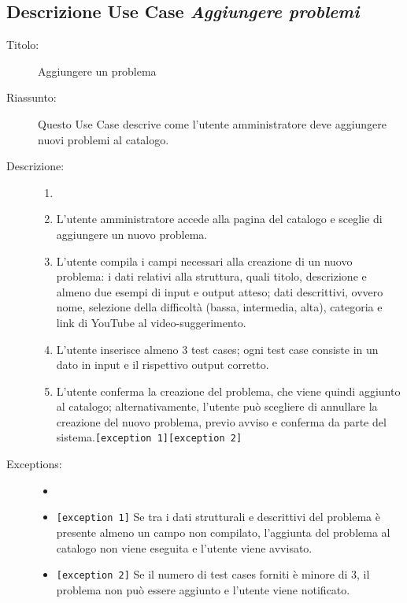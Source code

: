 \documentclass[11pt, a4paper]{article}
\theoremstyle{definition} %
\begin{document}
\newpage
\subsection*{Descrizione Use Case \textit{Aggiungere problemi}}
\begin{description}
    \item[Titolo:] Aggiungere un problema
    
    \item[Riassunto:] Questo Use Case descrive come l'utente amministratore
    deve aggiungere nuovi problemi al catalogo.

    \item[Descrizione:]
    \begin{enumerate}
        \item[]
        \item L'utente amministratore accede alla pagina del catalogo e sceglie di aggiungere un nuovo problema.
        \item L'utente compila i campi necessari alla creazione di un nuovo problema: i dati relativi alla struttura, quali titolo, descrizione e almeno due esempi di input e output atteso; dati descrittivi, ovvero nome, selezione della difficoltà (bassa, intermedia, alta), categoria e link di YouTube al video-suggerimento.
        \item L'utente inserisce almeno 3 test cases; ogni test case consiste in un dato in input e il rispettivo output corretto.
        \item L'utente conferma la creazione del problema, che viene quindi aggiunto al catalogo; alternativamente, l'utente può scegliere di annullare la creazione del nuovo problema, previo avviso e conferma da parte del sistema.\texttt{[exception 1]}\texttt{[exception 2]}
    \end{enumerate}
    
    \item[Exceptions:]
    \begin{itemize}
        \item[]
        \item \texttt{[exception 1]} Se tra i dati strutturali e descrittivi del problema è presente almeno un campo non compilato, l'aggiunta del problema al catalogo non viene eseguita e l'utente viene avvisato.
        \item \texttt{[exception 2]} Se il numero di test cases forniti è minore di 3, il problema non può essere aggiunto e l'utente viene notificato.
    \end{itemize}
\end{description}
\end{document}
